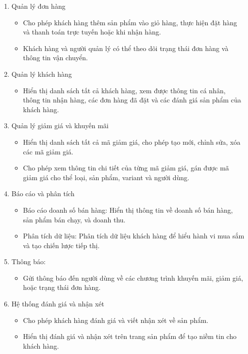 \begin{enumerate}
    \item Quản lý đơn hàng
    \begin{itemize}
        \item Cho phép khách hàng thêm sản phẩm vào giỏ hàng, thực hiện đặt hàng và thanh toán trực tuyến hoặc khi nhận hàng.
        \item Khách hàng và người quản lý có thể theo dõi trạng thái đơn hàng và thông tin vận chuyển.
    \end{itemize}
    \item Quản lý khách hàng
    \begin{itemize}
        \item Hiển thị danh sách tất cả khách hàng, xem được thông tin cá nhân, thông tin nhận hàng, các đơn hàng đã đặt và các đánh giá sản phẩm của khách hàng.
    \end{itemize}
    \item Quản lý giảm giá và khuyến mãi
    \begin{itemize}
        \item Hiển thị danh sách tất cả mã giảm giá, cho phép tạo mới, chỉnh sửa, xóa các mã giảm giá.
        \item Cho phép xem thông tin chi tiết của từng mã giảm giá, gán được mã giảm giá cho thể loại, sản phẩm, variant và người dùng.
    \end{itemize}
    \item Báo cáo và phân tích
    \begin{itemize}
        \item Báo cáo doanh số bán hàng: Hiển thị thông tin về doanh số bán hàng, sản phẩm bán chạy, và doanh thu.
        \item Phân tích dữ liệu: Phân tích dữ liệu khách hàng để hiểu hành vi mua sắm và tạo chiến lược tiếp thị.
    \end{itemize}
    \item Thông báo:
    \begin{itemize}
        \item Gửi thông báo đến người dùng về các chương trình khuyến mãi, giảm giá, hoặc trạng thái đơn hàng.
    \end{itemize}
    \item Hệ thống đánh giá và nhận xét
    \begin{itemize}
        \item Cho phép khách hàng đánh giá và viết nhận xét về sản phẩm.
        \item Hiển thị đánh giá và nhận xét trên trang sản phẩm để tạo niềm tin cho khách hàng.

\end{itemize}
\end{enumerate}
